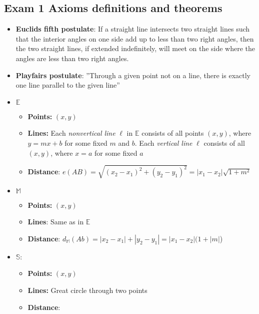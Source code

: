 \documentclass{report}
\begin{document}
    \pagebreak 
    \subsection{Exam 1 Axioms definitions and theorems}
    \begin{itemize}
    \item \textbf{Euclids fifth postulate}: If a straight line intersects two straight lines such that the interior angles on one side add up to less than two right angles, then the two straight lines, if extended indefinitely, will meet on the side where the angles are less than two right angles.
    \item \textbf{Playfairs postulate}: ”Through a given point not on a line, there is exactly one line parallel to the given line”
        \item \textbf{$\mathbb{E}$}
            \begin{itemize}
                \item \textbf{Points:} $(x,y)$
                \item \textbf{Lines:} Each \textit{nonvertical line} $\ell$ in $\mathbb{E}$ consists of all points $(x,y)$, where $y = mx + b$ for some fixed $m$ and $b$. Each \textit{vertical line} $\ell$ consists of all $(x,y)$, where $x=a$ for some fixed $a$
                \item \textbf{Distance}: $e(AB) = \sqrt{(x_{2} - x_{1})^{2} + (y_{2} - y_{1})^{2}} = \left\lvert x_{1}-x_{2} \right\rvert \sqrt{1+m^{2}}$
            \end{itemize}
        \item \textbf{$\mathbb{M}$}
            \begin{itemize}
                \item \textbf{Points:} $(x,y)$
                \item \textbf{Lines}: Same as in $\mathbb{E}$
                \item \textbf{Distance}: $d_{\mathbb{M}}(Ab) = \left\lvert x_{2} - x_{1} \right\rvert + \left\lvert y_{2} - y_{1} \right\rvert = \left\lvert x_{1} - x_{2} \right\rvert(1+\left\lvert m \right\rvert$) 
            \end{itemize}
        \item \textbf{$\mathbb{S}$}:
            \begin{itemize}
                \item \textbf{Points:} $(x,y)$
                \item \textbf{Lines:} Great circle through two points
                \item \textbf{Distance}:

\end{itemize}
\end{itemize}
\end{document}
